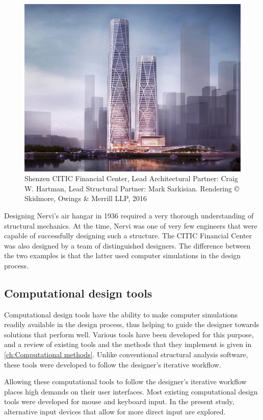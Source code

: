 \begin{figure}
  \includegraphics[width=350pt]{graphics/shenzen.jpg}
  \caption{Shenzen CITIC Financial Center, Lead Architectural Partner: Craig W. Hartman, Lead Structural Partner: Mark Sarkisian.  Rendering © Skidmore, Owings \& Merrill LLP, 2016}
  \label{fig:Shenzen}
\end{figure}

Designing Nervi’s air hangar in 1936 required a very thorough understanding of structural mechanics. At the time, Nervi was one of very few engineers that were capable of successfully designing such a structure. The CITIC Financial Center was also designed by a team of distinguished designers. The difference between the two examples is that the latter used computer simulations in the design process. 

\subsection{Computational design tools}
Computational design tools have the ability to make computer simulations readily available in the design process, thus helping to guide the designer towards solutions that perform well. Various tools have been developed for this purpose, and a review of existing tools and the methods that they implement is given in \ref{ch:Computational methods}. Unlike conventional structural analysis software, these tools were developed to follow the designer’s iterative workflow. 

Allowing these computational tools to follow the designer’s iterative workflow places high demands on their user interfaces. Most existing computational design tools were developed for mouse and keyboard input. In the present study, alternative input devices that allow for more direct input are explored. 

